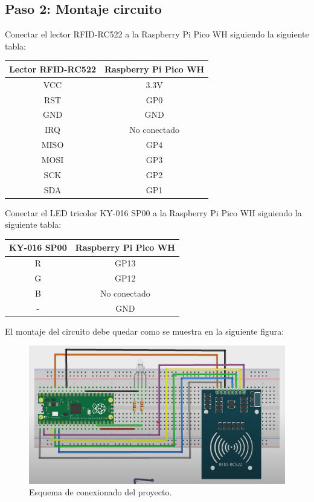 \documentclass{article}
\begin{document}
\subsection{Paso 2: Montaje circuito}
Conectar el lector RFID-RC522 a la Raspberry Pi Pico WH siguiendo la siguiente tabla:

\begin{center}
\begin{tabular}{|c|c|}
	\hline
	\textbf{Lector RFID-RC522} & \textbf{Raspberry Pi Pico WH} \\
	\hline
	VCC & 3.3V \\
	\hline
	RST & GP0 \\
	\hline
	GND & GND \\
	\hline
	IRQ & No conectado \\
	\hline
	MISO & GP4 \\
	\hline
	MOSI & GP3 \\
	\hline
	SCK & GP2 \\
	\hline
	SDA & GP1 \\
	\hline
\end{tabular}
\end{center}

Conectar el LED tricolor KY-016 SP00 a la Raspberry Pi Pico WH siguiendo la siguiente tabla:
\begin{center}
	\begin{tabular}{|c|c|}
		\hline
		\textbf{KY-016 SP00} & \textbf{Raspberry Pi Pico WH} \\
		\hline
		R & GP13 \\
		\hline
		G & GP12 \\
		\hline
		B & No conectado \\
		\hline
		- & GND \\
		\hline
	\end{tabular}
	\end{center}



El montaje del circuito debe quedar como se muestra en la siguiente figura:
\begin{figure}
	\centering
	\includegraphics[width=1\linewidth]{../images/esquema_de_conexionado.png}
	\caption{\label{fig:circuito}Esquema de conexionado del proyecto.}
\end{figure}
\end{document}

